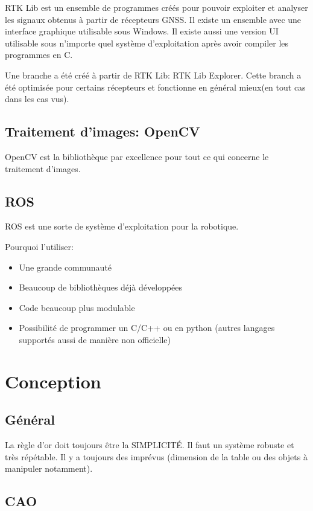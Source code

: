 \documentclass[a4paper, 11pt]{report}
\begin{document}
RTK Lib est un ensemble de programmes créés pour pouvoir exploiter et analyser les signaux obtenus à partir de récepteurs GNSS. Il existe un ensemble avec une interface graphique utilisable sous Windows. Il existe aussi une version UI utilisable sous n'importe quel système d'exploitation après avoir compiler les programmes en C.

Une branche a été créé à partir de RTK Lib: RTK Lib Explorer. Cette branch a été optimisée pour certains récepteurs et fonctionne en général mieux(en tout cas dans les cas vus).

\chapter{Traitement d'images: OpenCV}

OpenCV est la bibliothèque par excellence pour tout ce qui concerne le traitement d'images.

\chapter{ROS}

ROS est une sorte de système d'exploitation pour la robotique.

Pourquoi l'utiliser:
\begin{itemize}
\item Une grande communauté
\item Beaucoup de bibliothèques déjà développées
\item Code beaucoup plus modulable
\item Possibilité de programmer un C/C++ ou en python (autres langages supportés aussi de manière non officielle)
\end{itemize}



\part{Conception}

\chapter{Général}

La règle d'or doit toujours être la SIMPLICITÉ. Il faut un système robuste et très répétable. Il y a toujours des imprévus (dimension de la table ou des objets à manipuler notamment).

\chapter{CAO}
\end{document}
